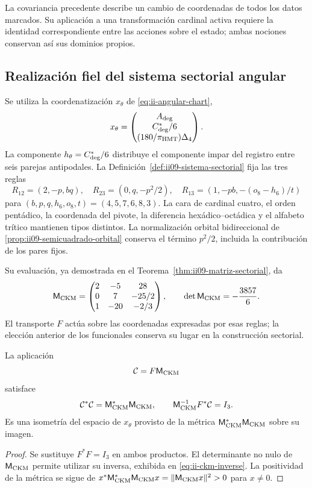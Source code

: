 La covariancia precedente describe un cambio de coordenadas de todos los
datos marcados. Su aplicación a una transformación cardinal activa requiere
la identidad correspondiente entre las acciones sobre el estado; ambas
nociones conservan así sus dominios propios.

\subsection{Realización fiel del sistema sectorial angular}

Se utiliza la coordenatización \(x_\theta\) de
\eqref{eq:ii-angular-chart},
\[
 x_\theta=\begin{pmatrix}A_{\rm deg}\\C^*_{\rm deg}/6\\
                              (180/\pi_{\rm HMT})\Delta_4\end{pmatrix}.
\]
La componente \(h_\theta=C^*_{\rm deg}/6\) distribuye el componente
impar del registro entre seis parejas antipodales. La
Definición~\ref{def:ii09-sistema-sectorial} fija las tres reglas
\[
 R_{12}=(2,-p,bq),\quad R_{23}=(0,q,-p^2/2),\quad
 R_{13}=(1,-pb,-(o_8-h_6)/t)
\]
para \((b,p,q,h_6,o_8,t)=(4,5,7,6,8,3)\). La cara de cardinal
cuatro, el orden pentádico, la coordenada del pivote, la diferencia
hexádico--octádica y el alfabeto trítico mantienen tipos distintos.
La normalización orbital bidireccional de
\ref{prop:ii09-semicuadrado-orbital} conserva el término \(p^2/2\),
incluida la contribución de los pares fijos.

Su evaluación, ya demostrada en el
Teorema~\ref{thm:ii09-matriz-sectorial}, da
\[
 \mathsf M_{\rm CKM}=
 \begin{pmatrix}2&-5&28\\0&7&-25/2\\1&-20&-2/3\end{pmatrix},
 \qquad\det\mathsf M_{\rm CKM}=-\frac{3857}{6}.
\]
El transporte \(F\) actúa sobre las coordenadas expresadas por esas
reglas; la elección anterior de los funcionales conserva su lugar en la
construcción sectorial.

\begin{corollary}
\label{cor:ii-witt-composed-reader}
La aplicación
\begin{equation}
 \mathcal C=F\mathsf M_{\rm CKM}
 \label{eq:ii-witt-composed-reader}
\end{equation}
satisface
\[
 \mathcal C^*\mathcal C=\mathsf M_{\rm CKM}^*\mathsf M_{\rm CKM},
 \qquad
 \mathsf M_{\rm CKM}^{-1}F^*\mathcal C=I_3.
\]
Es una isometría del espacio de \(x_\theta\) provisto de la métrica
\(\mathsf M_{\rm CKM}^*\mathsf M_{\rm CKM}\) sobre su imagen.
\end{corollary}
\begin{proof}
Se sustituye \(F^*F=I_3\) en ambos productos. El determinante no
nulo de \(\mathsf M_{\rm CKM}\) permite utilizar su inversa,
exhibida en \eqref{eq:ii-ckm-inverse}. La positividad de la métrica
se sigue de
\(x^*\mathsf M_{\rm CKM}^*\mathsf M_{\rm CKM}x
=\|\mathsf M_{\rm CKM}x\|^2>0\) para \(x\ne0\).
\end{proof}

